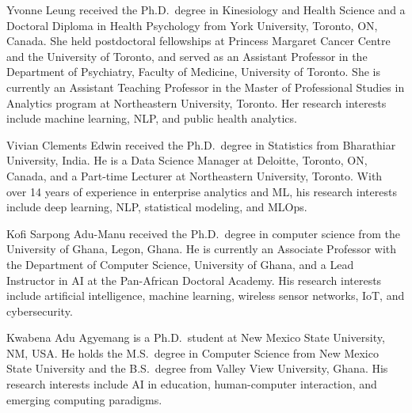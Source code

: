 \documentclass[lettersize,journal]{IEEEtran}
\begin{document}
\begin{IEEEbiography}{Yvonne Leung}
received the Ph.D.\ degree in Kinesiology and Health Science and a
Doctoral Diploma in Health Psychology from York University, Toronto,
ON, Canada. She held postdoctoral fellowships at Princess Margaret Cancer
Centre and the University of Toronto, and served as an Assistant Professor
in the Department of Psychiatry, Faculty of Medicine, University of Toronto.
She is currently an Assistant Teaching Professor in the Master of Professional
Studies in Analytics program at Northeastern University, Toronto. Her
research interests include machine learning, NLP, and public health analytics.
\end{IEEEbiography}

\begin{IEEEbiography}{Vivian Clements Edwin}
received the Ph.D.\ degree in Statistics from Bharathiar University, India.
He is a Data Science Manager at Deloitte, Toronto, ON, Canada, and a
Part-time Lecturer at Northeastern University, Toronto. With over 14 years
of experience in enterprise analytics and ML, his research interests include
deep learning, NLP, statistical modeling, and MLOps.
\end{IEEEbiography}

\begin{IEEEbiography}{Kofi Sarpong Adu-Manu}
received the Ph.D.\ degree in computer science from the University of Ghana,
Legon, Ghana. He is currently an Associate Professor with the Department of
Computer Science, University of Ghana, and a Lead Instructor in AI at the
Pan-African Doctoral Academy. His research interests include artificial
intelligence, machine learning, wireless sensor networks, IoT, and
cybersecurity.
\end{IEEEbiography}

\begin{IEEEbiography}{Kwabena Adu Agyemang}
is a Ph.D.\ student at New Mexico State University, NM, USA. He holds the
M.S.\ degree in Computer Science from New Mexico State University and the
B.S.\ degree from Valley View University, Ghana. His research interests
include AI in education, human-computer interaction, and emerging computing
paradigms.
\end{IEEEbiography}
\end{document}
